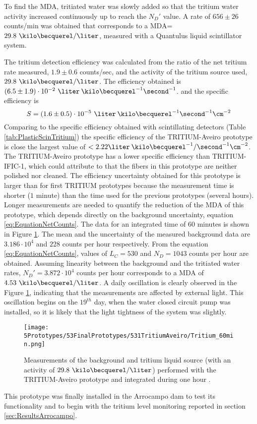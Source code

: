 To find the MDA, tritiated water was slowly added  so that the tritium water activity increased continuously up to reach the $N_D'$ value. A rate of $656 \pm 26$ counts/min was obtained that corresponds to a MDA=$29.8~\kilo\becquerel/\liter$, measured with a Quantulus liquid scintillator system.

The tritium detection efficiency was calculated from the ratio of the net tritium rate measured, $1.9 \pm 0.6$ counts/sec, and the activity of the tritium source used, $29.8~\kilo\becquerel/\liter$. The efficiency obtained is $(6.5 \pm 1.9)\cdot{} 10^{-2}~\liter\:\kilo\becquerel^{-1}\second^{-1}$.  and the specific efficiency is
$$S=(1.6 \pm 0.5)\cdot{} 10^{-5}~\liter\:\kilo\becquerel^{-1}\second^{-1}\cm^{-2}$$ 
Comparing to the specific efficiency obtained with scintillating detectors (Table \ref{tab:PlasticScinTritium}) the specific efficiency of the TRITIUM-Aveiro prototype is close the largest value \cite{Hofstetter1, Hofstetter2} of $<2.22\liter\:\kilo\becquerel^{-1}/\second^{-1}\cm^{-2}$. The TRITIUM-Aveiro prototype has a lower specific efficiency than TRITIUM-IFIC-1, which could attribute to that the fibers in this prototype are neither polished nor cleaned. The efficiency uncertainty obtained for this prototype is larger than for first TRITIUM prototypes because the measurement time is shorter ($1$ minute) than the time used for the previous prototypes (several hours). Longer measurements are needed to quantify the reduction of the MDA of this prototype, which depends directly on the background uncertainty, equation \ref{eq:EquationNetCounts}. The data for an integrated time of $60$ minutes is shown in Figure \ref{fig:Tritium60min}. The mean and the uncertainty of the measured background data are $3.186 \cdot{} 10^{4}$ and $228$ counts per hour respectively. From the equation \ref{eq:EquationNetCounts}, values of $L_C=530$ and $N_D=1043$ counts per hour are obtained. Assuming linearity between the background and the tritiated water rates, $N_D'=3.872\cdot{}10^4$ counts per hour corresponds to a MDA of $4.53~\kilo\becquerel/\liter$. A daily oscillation is clearly observed in the Figure \ref{fig:Tritium60min}, indicating that the measurements are affected by external light. This oscillation begins on the $19^{th}$ day, when the water closed circuit pump was installed, so it is likely that the light tightness of the system was slightly.
\begin{figure}[h]
\centering
\texttt{[image: 5Prototypes/53FinalPrototypes/531TritiumAveiro/Tritium\_60min.png]}
\caption{Measurements of the background and tritium liquid source (with an activity of $29.8~\kilo\becquerel/\liter$) performed with the TRITIUM-Aveiro prototype and integrated during one hour \cite{ExperimentalPaperCarlos}.\label{fig:Tritium60min}}
\end{figure}
This prototype was finally installed in the Arrocampo dam to test its functionality and to begin with the tritium level monitoring reported in section \ref{sec:ResultsArrocampo}.